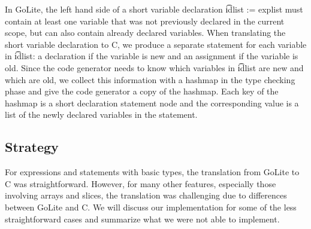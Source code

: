 \documentclass[11pt]{article}
\begin{document}
In GoLite, the left hand side of a short variable declaration \t{idlist := explist} must contain at least one variable that was not previously declared in the current scope, but can also contain already declared variables. When translating the short variable declaration to C, we produce a separate statement for each variable in \t{idlist}: a declaration if the variable is new and an assignment if the variable is old. Since the code generator needs to know which variables in \t{idlist} are new and which are old, we collect this information with a hashmap in the type checking phase and give the code generator a copy of the hashmap. Each key of the hashmap is a short declaration statement node and the corresponding value is a list of the newly declared variables in the statement. 



\subsection{Strategy}

For expressions and statements with basic types, the translation from GoLite to C was straightforward. However, for many other features, especially those involving arrays and slices, the translation was challenging due to differences between GoLite and C. We will discuss our implementation for some of the less straightforward cases and summarize what we were not able to implement.
\end{document}
